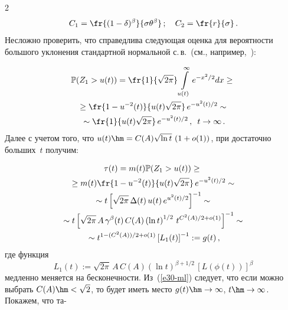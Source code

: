 \begin{multicols}{2}
\noindent
\begin{equation}
C_1=\fr{(1-\delta)^\beta}{\sigma{\theta}^\beta}\,;\quad C_2=\fr{r}{\sigma}\,.
\label{e29a-ml}
\end{equation}
Несложно проверить, что справедлива следующая оценка для вероятности
большого уклонения стандартной нормальной с.\,в.\ (см., например,~\cite{Lifshits}):

\noindent
\begin{multline*}
\mathbb{P} (Z_1 > u(t))=\fr{1}{\sqrt{2\pi}}\int\limits_{u(t)}^\infty
e^{-x^2/2}dx\geq{}\\
{}\geq \fr{1-u^{-2}(t)}{u(t)\sqrt{2\pi}}\,e^{-u^2(t)/2}\sim{}\\
{}\sim
\fr{1}{u(t)\sqrt{2\pi}}\,e^{-u^2(t)/2}\,,\enskip t \to \infty\,.
\end{multline*}
Далее с учетом того, что $u(t) \hm= C(A) \sqrt{\ln t}\,\left(1+o(1)\right)$,
при достаточно больших~$t$ получим:

\noindent
\begin{multline}
\tau(t)=m(t)\mathbb{P}(Z_1>u(t))\geq{}\\
{}\geq m(t)\fr{1-u^{-2}(t)}{u(t)\sqrt{2\pi}}\,e^{-u^2(t)/2}\sim{}\\
{}\sim t\left[\sqrt{2\pi}\,\Delta(t)\,u(t)\,e^{u^2(t)/2}\right]^{-1}\sim{}\\
{}\sim t \left[\sqrt{2\pi}\,A\,\gamma^\beta(t) \, C(A)\left(\ln t\right)^{1/2}\, t^{C^2(A)/2+o(1)}\right]^{-1}\sim{}\\
{}\sim t^{1-({C^2(A)})/{2}+o(1)}\left[L_1(t)\right]^{-1}:=g(t)\,,\label{e30-ml}
\end{multline}
где функция
$$
L_1(t):=\sqrt{2\pi}\,A\, C(A)(\ln t)^{\beta+1/2}\,[L(\phi(t))]^\beta
$$  
медленно меняется на бесконечности. Из~(\ref{e30-ml}) следует, что  если можно выбрать
$C(A)\hm<\sqrt{2}$, то будет иметь место  $g(t)\hm\to \infty$, $t\hm\to \infty$. 
Покажем, что та-\linebreak\vspace*{-12pt}

\pagebreak


\end{multicols}
